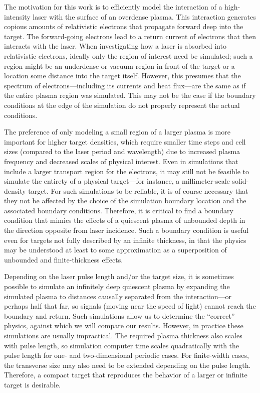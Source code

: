 \documentclass[../absorber.tex]{subfiles}
\begin{document}
The motivation for this work is to efficiently model the interaction of a high-intensity laser with the surface of an overdense plasma. This interaction generates copious amounts of relativistic electrons that propagate forward deep into the target. The forward-going electrons lead to a return current of electrons that then interacts with the laser.  When investigating how a laser is absorbed into relativistic electrons, ideally only the region of interest need be simulated; such a region might be an underdense or vacuum region in front of the target or a location some distance into the target itself.  However, this presumes that the spectrum of electrons---including its currents and heat flux---are the same as if the entire plasma region was simulated.  This may not be the case if the boundary conditions at the edge of the simulation do not properly represent the actual conditions.

The preference of only modeling a small region of a larger plasma is more important for higher target densities, which require smaller time steps and cell sizes (compared to the laser period and wavelength) due to increased plasma frequency and decreased scales of physical interest.  Even in simulations that include a larger transport region for the electrons, it may still not be feasible to simulate the entirety of a physical target---for instance, a millimeter-scale solid-density target. For such simulations to be reliable, it is of course necessary that they not be affected by the choice of the simulation boundary location and the associated boundary conditions. Therefore, it is critical to find a boundary condition that mimics the effects of a quiescent plasma of unbounded depth in the direction opposite from laser incidence.  Such a boundary condition is useful even for targets not fully described by an infinite thickness, in that the physics may be understood at least to some approximation as a superposition of unbounded and finite-thickness effects.

Depending on the laser pulse length and/or the target size, it is sometimes possible to simulate an infinitely deep quiescent plasma by expanding the simulated plasma to distances causally separated from the interaction---or perhaps half that far, so signals (moving near the speed of light) cannot reach the boundary and return.  Such simulations allow us to determine the ``correct'' physics, against which we will compare our results.  However, in practice these simulations are usually impractical.
The required plasma thickness also scales with pulse length, so simulation computer time scales quadratically with the pulse length for one- and two-dimensional periodic cases. For finite-width cases, the transverse size may also need to be extended depending on the pulse length.
Therefore, a compact target that reproduces the behavior of a larger or infinite target is desirable.
\end{document}
